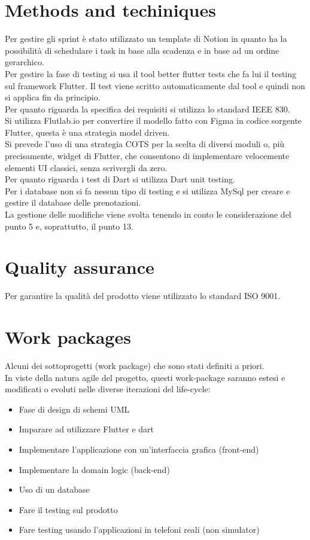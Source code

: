 \documentclass{article}
\begin{document}
\section{Methods and techiniques}
Per gestire gli sprint è stato utilizzato un template di Notion in quanto ha la possibilità di schedulare i task in base alla scadenza e in base ad un ordine gerarchico.
\\Per gestire la fase di testing si usa il tool better flutter tests che fa lui il testing sul framework Flutter. Il test viene scritto automaticamente dal tool e quindi 
non si applica fin da principio.
\\Per quanto riguarda la specifica dei requisiti si utilizza lo standard IEEE 830.
\\Si utilizza Flutlab.io per convertire il modello fatto con Figma in codice sorgente Flutter, questa è una strategia model driven.
\\Si prevede l'uso di una strategia COTS per la scelta di diversi moduli o, più precisamente, widget di Flutter, che consentono di implementare velocemente
elementi UI classici, senza scrivergli da zero.
\\Per quanto riguarda i test di Dart si utilizza Dart unit testing.
\\Per i database non si fa nessun tipo di testing e si utilizza MySql per creare e gestire il database delle prenotazioni.
\\La gestione delle modifiche viene svolta tenendo in conto le considerazione del punto 5 e, soprattutto, il punto 13.
\section{Quality assurance}
Per garantire la qualità del prodotto viene utilizzato lo standard ISO 9001.

\section{Work packages}
Alcuni dei sottoprogetti (work package) che sono stati definiti a priori.
\\ In viste della natura agile del progetto, questi work-package saranno estesi e modificati o evoluti nelle diverse iterazioni del life-cycle:
\begin{itemize}
    \item Fase di design di schemi UML
    \item Imparare ad utilizzare Flutter e dart
    \item Implementare l'applicazione con un'interfaccia grafica (front-end)
    \item Implementare la domain logic (back-end)
    \item Uso di un database
    \item Fare il testing sul prodotto
    \item Fare testing usando l'applicazioni in telefoni reali (non simulator)
\end{itemize}
\end{document}
